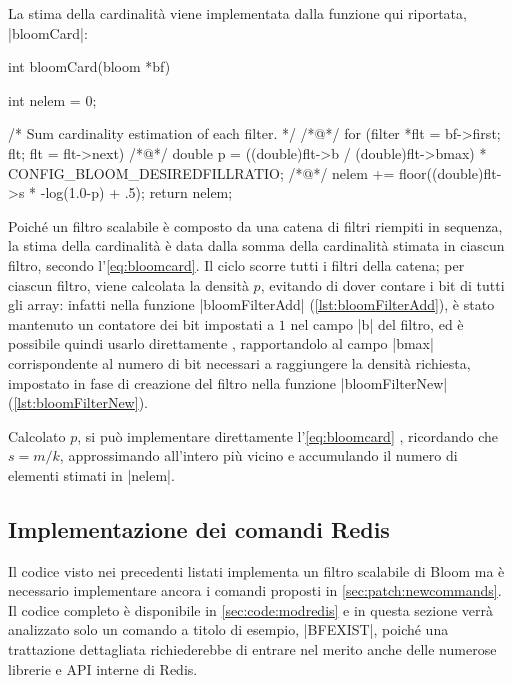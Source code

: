 La stima della cardinalità viene implementata dalla funzione qui riportata, \cverb|bloomCard|:

\begin{commentedsource}[style=csource,caption=Stima della cardinalità]
int bloomCard(bloom *bf) {
    int nelem = 0;

    /* Sum cardinality estimation of each filter. */
/*@\lnote@*/    for (filter *flt = bf->first; flt; flt = flt->next) {
/*@\lnote@*/        double p = ((double)flt->b / (double)flt->bmax) * CONFIG_BLOOM_DESIREDFILLRATIO;
/*@\lnote@*/        nelem += floor((double)flt->s * -log(1.0-p) + .5);
    }
    return nelem;
}
\end{commentedsource}

Poiché un filtro scalabile è composto da una catena di filtri riempiti in sequenza, la stima
della cardinalità è data dalla somma della cardinalità stimata in ciascun filtro, secondo 
l'\autoref{eq:bloomcard}. Il ciclo  scorre tutti i filtri della catena; per ciascun
filtro, viene calcolata la densità $p$, evitando di dover contare i bit di tutti gli array: infatti
nella funzione \cverb|bloomFilterAdd| (\autoref{lst:bloomFilterAdd}), è stato mantenuto un contatore
dei bit impostati a $1$ nel campo \cverb|b| del filtro, ed è possibile quindi usarlo direttamente
, rapportandolo al campo \cverb|bmax| corrispondente al numero di bit necessari a
raggiungere la densità richiesta, impostato in fase di creazione del filtro nella funzione
\cverb|bloomFilterNew| (\autoref{lst:bloomFilterNew}). 

Calcolato $p$, si può implementare direttamente l'\autoref{eq:bloomcard} , ricordando che
$s = m/k$, approssimando all'intero più vicino e accumulando il numero di elementi stimati in
\cverb|nelem|.

\subsection{Implementazione dei comandi Redis}

Il codice visto nei precedenti listati implementa un filtro scalabile di Bloom ma è necessario
implementare ancora i comandi proposti in \autoref{sec:patch:newcommands}. Il codice completo è
disponibile in \autoref{sec:code:modredis} e in questa sezione verrà analizzato solo un comando a
titolo di esempio, \cverb|BFEXIST|, poiché una trattazione dettagliata richiederebbe di entrare nel
merito anche delle numerose librerie e API interne di Redis.

